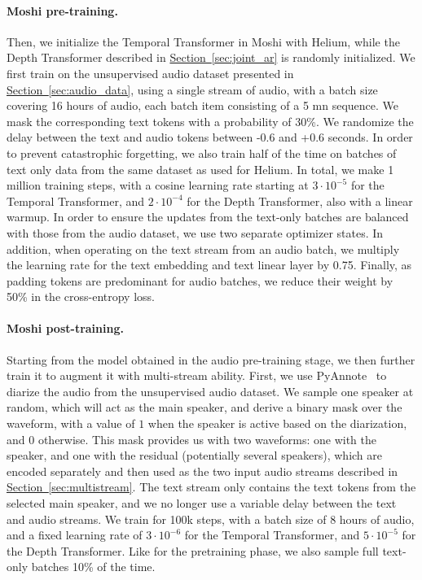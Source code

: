 \paragraph{Moshi pre-training.}
Then, we initialize the Temporal Transformer in Moshi with Helium, while the Depth Transformer described in \hyperref[sec:joint_ar]{Section~\ref{sec:joint_ar}} is randomly initialized. 
We first train on the unsupervised audio dataset presented in \hyperref[sec:audio_data]{Section~\ref{sec:audio_data}}, using a single stream of audio, with a batch size covering 16 hours of audio, each batch item consisting of a 5 mn sequence. We mask the corresponding text tokens with a probability of 30\%. We randomize the delay between the text and audio tokens between -0.6 and +0.6 seconds.
In order to prevent catastrophic forgetting, we also train half of the time on batches of text only data from the same dataset as used for Helium. In total, we make 1 million training steps, with a cosine learning rate starting at $3\cdot 10^{-5}$ for the Temporal Transformer, and $2\cdot 10^{-4}$ for the Depth Transformer, also with a linear warmup. In order to ensure the updates from the text-only batches are balanced with those from the audio dataset, we use two separate optimizer states. In addition, when operating on the text stream from an audio batch, we multiply the learning rate for the text embedding and text linear layer by 0.75. Finally, as padding tokens are predominant for audio batches, we reduce their weight by 50\% in the cross-entropy loss. 

\paragraph{Moshi post-training.}
Starting from the model obtained in the audio pre-training stage, we then further train it to augment it with multi-stream ability. First, we use PyAnnote~\citep{Bredin23} to diarize the audio from the unsupervised audio dataset. We sample one speaker at random, which will act as the main speaker, and derive a binary mask over the waveform, with a value of $1$ when the speaker is active based on the diarization, and $0$ otherwise. This mask provides us with two waveforms: one with the speaker, and one with the residual (potentially several speakers), which are encoded separately and then used as the two input audio streams described in \hyperref[sec:multistream]{Section~\ref{sec:multistream}}. The text stream only contains the text tokens from the selected main speaker, and we no longer use a variable delay between the text and audio streams. We train for 100k steps, with a batch size of 8 hours of audio, and a fixed learning rate of $3\cdot 10^{-6}$ for the Temporal Transformer, and $5\cdot 10^{-5}$ for the Depth Transformer. Like for the pretraining phase, we also sample full text-only batches 10\% of the time.


